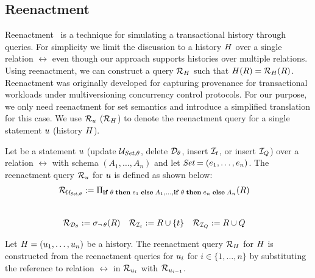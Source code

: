 \subsection{Reenactment}
\label{sec:reenactment}

Reenactment~\cite{AG18,AG14} is a technique
for simulating a transactional history through queries. For simplicity we limit the discussion to a history $H$ over a single relation $\rel$ even though our approach supports histories over multiple relations. Using reenactment, we
can construct a query $\mathcal{R}_{H}$ such that
$H(R) = \mathcal{R}_{H}(R)$. Reenactment
was originally developed for capturing provenance for transactional workloads
under multiversioning concurrency control protocols. For our purpose, we only
need reenactment for set semantics and introduce a simplified translation for this case.
We use $\mathcal{R}_{u}$ ($\mathcal{R}_{H}$) to denote the reenactment query for a single statement $u$ (history $H$).

\begin{defi}\label{def:reenactment-queries}
  Let be a statement $u$ (update $\mathcal{U}_{\textit{Set},\theta}$, delete $\mathcal{D}_{\theta}$, insert $\mathcal{I}_{t}$, or insert $\mathcal{I}_{Q}$) over a relation $\rel$ with schema $(A_1, \ldots, A_n)$ and let $\textit{Set} = (e_1, \ldots, e_n)$. The reenactment query  $\mathcal{R}_{u}$ for $u$ is defined as shown below:
%
  \begin{align*}
    \mathcal{R}_{\mathcal{U}_{\textit{Set},\theta}} & := \Pi_{\mathbf{if}\thickspace \theta \thickspace \mathbf{then} \thickspace e_1 \thickspace \mathbf{else} \thickspace A_1, \ldots, \mathbf{if}\thickspace \theta \thickspace \mathbf{then} \thickspace e_n \thickspace \mathbf{else} \thickspace A_n}(R)
  \end{align*}\\[-9mm]
  \begin{align*}
        \mathcal{R}_{\mathcal{D}_{\theta}} & := \sigma_{\neg\, \theta}(R) &
    \mathcal{R}_{\mathcal{I}_{t}} & := R \cup \{ t \} &
    \mathcal{R}_{\mathcal{I}_{Q}} & := R \cup Q
  \end{align*}

%
Let $H = (u_1, \ldots, u_n)$ be a history. The reenactment query $\mathcal{R}_{H}$ for $H$ is constructed from the reenactment queries for $u_i$ for $i \in \{1,\ldots,n\}$ by substituting the reference to relation $\rel$ in $\mathcal{R}_{u_i}$ with $\mathcal{R}_{u_{i-1}}$.
\end{defi}

